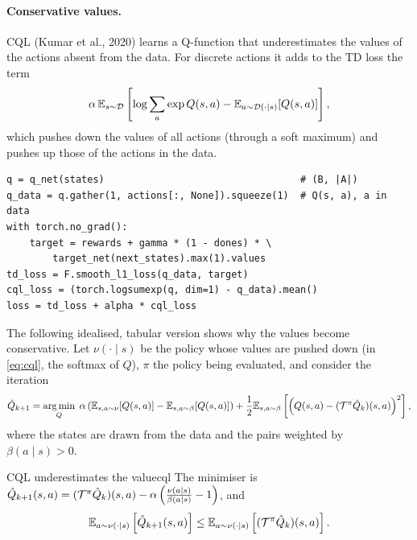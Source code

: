 \paragraph{Conservative values.} CQL (Kumar et al., 2020) learns a
Q-function that underestimates the values of the actions absent from the
data. For discrete actions it adds to the TD loss the term
\begin{equation}
  \label{eq:cql}
  \alpha\, \mathbb{E}_{s \sim \mathcal{D}}\left[ \log \sum_{a} \exp Q(s, a) -
  \mathbb{E}_{a \sim \mathcal{D}(\cdot \mid s)}[Q(s, a)] \right],
\end{equation}
which pushes down the values of all actions (through a soft maximum) and
pushes up those of the actions in the data.

\begin{lstlisting}[caption={CQL loss for discrete actions (PyTorch)}]
q = q_net(states)                                  # (B, |A|)
q_data = q.gather(1, actions[:, None]).squeeze(1)  # Q(s, a), a in data
with torch.no_grad():
    target = rewards + gamma * (1 - dones) * \
        target_net(next_states).max(1).values
td_loss = F.smooth_l1_loss(q_data, target)
cql_loss = (torch.logsumexp(q, dim=1) - q_data).mean()
loss = td_loss + alpha * cql_loss
\end{lstlisting}

The following idealised, tabular version shows why the values become
conservative. Let $\nu(\cdot \mid s)$ be the policy whose values are pushed
down (in \eqref{eq:cql}, the softmax of $Q$), $\pi$ the policy being
evaluated, and consider the iteration
\begin{equation*}
  \hat Q_{k+1} = \operatorname*{arg\,min}_Q\; \alpha \left( \mathbb{E}_{s, a \sim \nu} [Q(s, a)] -
  \mathbb{E}_{s, a \sim \beta}[Q(s, a)] \right) + \frac{1}{2} \mathbb{E}_{s, a \sim \beta}
  \left[ \left( Q(s, a) - (\mathcal{T}^\pi \hat Q_k)(s, a) \right)^2 \right],
\end{equation*}
where the states are drawn from the data and the pairs weighted by
$\beta(a \mid s) > 0$.

\begin{proposition}{CQL underestimates the value}{cql}
  The minimiser is $\hat Q_{k+1}(s, a) = (\mathcal{T}^\pi \hat Q_k)(s, a) - \alpha
  \left( \frac{\nu(a \mid s)}{\beta(a \mid s)} - 1 \right)$, and
  \begin{equation}
    \mathbb{E}_{a \sim \nu(\cdot \mid s)}\left[ \hat Q_{k+1}(s, a) \right] \leq
    \mathbb{E}_{a \sim \nu(\cdot \mid s)}\left[ (\mathcal{T}^\pi \hat Q_k)(s, a) \right].
  \end{equation}
\end{proposition}

